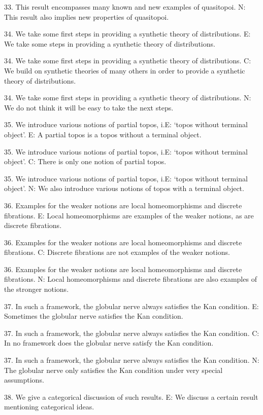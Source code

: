 33. This result encompasses many known and new examples of quasitopoi.
N:  This result also implies new properties of quasitopoi.

34. We take some first steps in providing a synthetic theory of distributions.
E: We take some steps in providing a synthetic theory of distributions.

34. We take some first steps in providing a synthetic theory of distributions.
C: We build on synthetic theories of many others in order to provide a synthetic theory of distributions.

34. We take some first steps in providing a synthetic theory of distributions.
N: We do not think it will be easy to take the next steps.

35. We introduce various notions of partial topos, i.E: `topos without terminal object'.
E:  A partial topos is a topos without a terminal object.

35. We introduce various notions of partial topos, i.E: `topos without terminal object'.
C:  There is only one notion of partial topos.

35. We introduce various notions of partial topos, i.E: `topos without terminal object'.
N:  We also introduce various notions of topos with a terminal object.

36. Examples for the weaker notions are local homeomorphisms and discrete fibrations.
E:  Local homeomorphisms are examples of the weaker notions, as are discrete fibrations.

36. Examples for the weaker notions are local homeomorphisms and discrete fibrations.
C: Discrete fibrations are not examples of the weaker notions.

36. Examples for the weaker notions are local homeomorphisms and discrete fibrations.
N: Local homeomorphisms and discrete fibrations are also examples of the stronger notions.

37. In such a framework, the globular nerve always satisfies the Kan condition.
E:  Sometimes the globular nerve satisfies the Kan condition.

37. In such a framework, the globular nerve always satisfies the Kan condition.
C:  In no framework does the globular nerve satisfy the Kan condition.

37. In such a framework, the globular nerve always satisfies the Kan condition.
N:  The globular nerve only satisfies the Kan condition under very special assumptions.

38. We give a categorical discussion of such results.
E:  We discuss a certain result mentioning categorical ideas.

